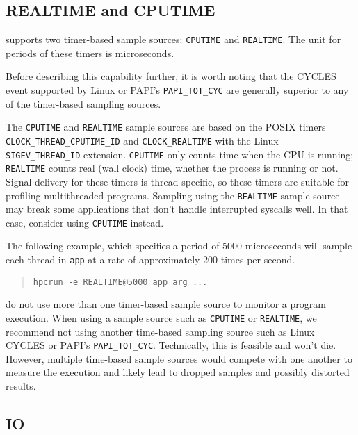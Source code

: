 \subsection{REALTIME and CPUTIME}
\label{linux-timers}

\HPCToolkit{} supports two timer-based sample sources: \verb|CPUTIME| and
\verb|REALTIME|.
The unit for periods of these timers is microseconds.

Before describing this capability further, it is worth noting
that the CYCLES event supported by Linux \perfevents{} or PAPI's \verb|PAPI_TOT_CYC| 
are generally superior to any of the timer-based sampling sources. 

\sloppy
The \verb|CPUTIME| and \verb|REALTIME| sample sources are based on the POSIX
timers \verb|CLOCK_THREAD_CPUTIME_ID| and \verb|CLOCK_REALTIME| with 
the Linux \verb|SIGEV_THREAD_ID| extension.  
\verb|CPUTIME| only counts time when the CPU is running;  
\verb|REALTIME| counts
real (wall clock) time, whether the process is running or not. 
Signal delivery for these timers is thread-specific, so these timers are suitable for
profiling multithreaded programs.
Sampling using the \verb|REALTIME| sample source
may break some applications that don't handle interrupted syscalls well.  In that
case, consider using \verb|CPUTIME| instead.

The following example, which specifies a period of 5000 microseconds will sample
each thread in \verb|app| at a rate of approximately 200 times per second.

\begin{quote}
\begin{verbatim}
hpcrun -e REALTIME@5000 app arg ...
\end{verbatim}
\end{quote}


 do not use more than one timer-based sample source to monitor a program execution.
When using a sample source such as \verb|CPUTIME| or \verb|REALTIME|,
we recommend not using another time-based sampling source such as 
Linux \perfevents{} CYCLES or PAPI's \verb|PAPI_TOT_CYC|. 
Technically, this is feasible and \hpcrun{} won't die.
However, multiple time-based sample sources would compete with one another to measure the
execution and likely lead to dropped samples and possibly distorted results.

\subsection{IO}

